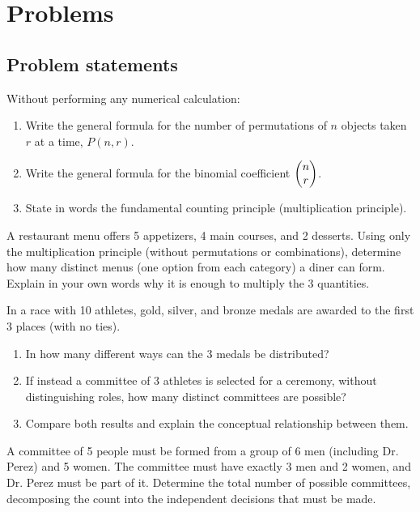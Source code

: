 \section*{Problems}

\subsection*{Problem statements}

\begin{problema}
	\label{prob:6369f2a}
	Without performing any numerical calculation:
	\begin{enumerate}
		\item Write the general formula for the number of permutations of $n$ objects taken $r$ at a time, $P(n,r)$.
		\item Write the general formula for the binomial coefficient $\begin{pmatrix} n \\ r\end{pmatrix}$.
		\item State in words the fundamental counting principle (multiplication principle).
	\end{enumerate}
\end{problema}

\begin{problema}
	\label{prob:4f6f981}
	A restaurant menu offers 5 appetizers, 4 main courses, and 2 desserts. Using only the multiplication principle (without permutations or combinations), determine how many distinct menus (one option from each category) a diner can form. Explain in your own words why it is enough to multiply the 3 quantities.
\end{problema}

\begin{problema}
	\label{prob:490657c}
	In a race with 10 athletes, gold, silver, and bronze medals are awarded to the first 3 places (with no ties).
	\begin{enumerate}
		\item In how many different ways can the 3 medals be distributed?
		\item If instead a committee of 3 athletes is selected for a ceremony, without distinguishing roles, how many distinct committees are possible?
		\item Compare both results and explain the conceptual relationship between them.
	\end{enumerate}
\end{problema}

\begin{problema}
	\label{prob:d8ce0cf}
	A committee of 5 people must be formed from a group of 6 men (including Dr. Perez) and 5 women. The committee must have exactly 3 men and 2 women, and Dr. Perez must be part of it. Determine the total number of possible committees, decomposing the count into the independent decisions that must be made.
\end{problema}


